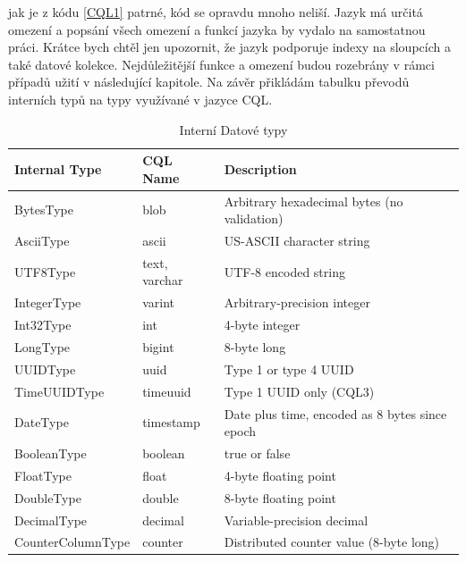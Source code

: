 jak je z kódu \ref{CQL1} patrné, kód se opravdu mnoho neliší. Jazyk má určitá omezení a popsání všech omezení a funkcí jazyka by vydalo na samostatnou práci. Krátce bych chtěl jen upozornit, že jazyk podporuje indexy na sloupcích a také datové kolekce. Nejdůležitější funkce a omezení budou rozebrány v rámci případů užití v následující kapitole. Na závěr přikládám tabulku převodů interních typů na typy využívané v jazyce CQL.

\begin{table}[h]

    \begin{tabular}{|l|l|l|}
    \hline
    Internal Type     & CQL Name      & Description                                    \\ \hline
    BytesType         & blob          & Arbitrary hexadecimal bytes (no validation)    \\ \hline
    AsciiType         & ascii         & US-ASCII character string                      \\ \hline
    UTF8Type          & text, varchar & UTF-8 encoded string                           \\ \hline
    IntegerType       & varint        & Arbitrary-precision integer                    \\ \hline
    Int32Type         & int           & 4-byte integer                                 \\ \hline
    LongType          & bigint        & 8-byte long                                    \\ \hline
    UUIDType          & uuid          & Type 1 or type 4 UUID                          \\ \hline
    TimeUUIDType      & timeuuid      & Type 1 UUID only (CQL3)                        \\ \hline
    DateType          & timestamp     & Date plus time, encoded as 8 bytes since epoch \\ \hline
    BooleanType       & boolean       & true or false                                  \\ \hline
    FloatType         & float         & 4-byte floating point                          \\ \hline
    DoubleType        & double        & 8-byte floating point                          \\ \hline
    DecimalType       & decimal       & Variable-precision decimal                     \\ \hline
    CounterColumnType & counter       & Distributed counter value (8-byte long)        \\ \hline
    \end{tabular}
    \caption {Interní Datové typy}
   \label{datatypes}
\end{table}